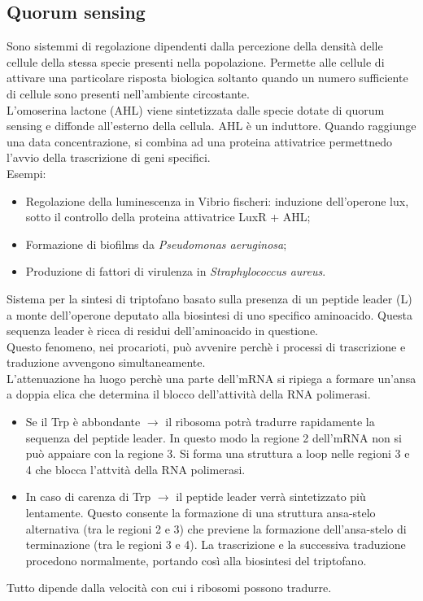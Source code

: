 \subsection{Quorum sensing}
Sono sistemmi di regolazione dipendenti dalla percezione della densità delle cellule della stessa specie presenti nella popolazione. Permette alle cellule di attivare una particolare risposta biologica soltanto quando un numero sufficiente di cellule sono presenti nell'ambiente circostante.
\\L'omoserina lactone (AHL) viene sintetizzata dalle specie dotate di quorum sensing e diffonde all'esterno della cellula.  AHL è un induttore. Quando raggiunge una data concentrazione, si combina ad una proteina attivatrice permettnedo l'avvio della trascrizione di geni specifici. 
\\Esempi: 
\begin{itemize}
    \item Regolazione della luminescenza in Vibrio fischeri: induzione dell'operone lux, sotto il controllo della proteina attivatrice LuxR + AHL; 
    \item Formazione di biofilms da \textit{Pseudomonas aeruginosa}; 
    \item Produzione di fattori di virulenza in \textit{Straphylococcus aureus}.
\end{itemize}
Sistema per la sintesi di triptofano basato sulla presenza di un peptide leader (L) a monte dell'operone deputato alla biosintesi di uno specifico aminoacido. Questa sequenza leader è ricca di residui dell'aminoacido in questione. 
\\Questo fenomeno, nei procarioti, può avvenire perchè i processi di trascrizione e traduzione avvengono simultaneamente. 
\\L'attenuazione ha luogo perchè una parte dell'mRNA si ripiega a formare un'ansa a doppia elica che determina il blocco dell'attività della RNA polimerasi. 
\begin{itemize}
    \item Se il Trp è abbondante $\rightarrow$ il ribosoma potrà tradurre rapidamente la sequenza del peptide leader. In questo modo la regione 2 dell'mRNA non si può appaiare con la regione 3. Si forma una struttura a loop nelle regioni 3 e 4 che blocca l'attvità della RNA polimerasi. 
    \item In caso di carenza di Trp $\rightarrow{}$ il peptide leader verrà sintetizzato più lentamente. Questo consente la formazione di una struttura ansa-stelo alternativa (tra le regioni 2 e 3) che previene la formazione dell'ansa-stelo di terminazione (tra le regioni 3 e 4). La trascrizione e la successiva traduzione procedono normalmente, portando così alla biosintesi del triptofano. 
\end{itemize}
Tutto dipende dalla velocità con cui i ribosomi possono tradurre. 
